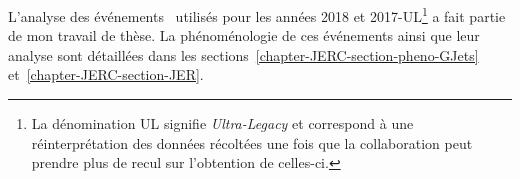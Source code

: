 \par L'analyse des événements \Gjets\ utilisés pour les années 2018 et 2017-UL\footnote{La dénomination \og UL \fg{} signifie \emph{Ultra-Legacy} et correspond à une réinterprétation des données récoltées une fois que la collaboration peut prendre plus de recul sur l'obtention de celles-ci.} a fait partie de mon travail de thèse.
La phénoménologie de ces événements ainsi que leur analyse sont détaillées dans les sections~\ref{chapter-JERC-section-pheno-GJets} et~\ref{chapter-JERC-section-JER}.
